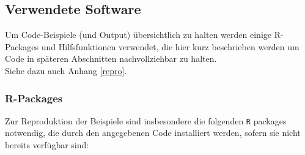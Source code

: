 \documentclass[ngerman,a4paper,]{scrartcl}
\theoremstyle{definition}
\theoremstyle{definition}
\theoremstyle{definition}
\theoremstyle{remark}
\begin{document}
\hypertarget{software-funs}{%
\subsection{Verwendete Software}\label{software-funs}}

Um Code-Beispiele (und Output) übersichtlich zu halten werden einige R-Packages und Hilfsfunktionen verwendet, die hier kurz beschrieben werden um Code in späteren Abschnitten nachvollziehbar zu halten.\\
Siehe dazu auch Anhang \ref{repro}.

\hypertarget{r-packages}{%
\subsubsection{R-Packages}\label{r-packages}}

Zur Reproduktion der Beispiele sind insbesondere die folgenden \texttt{R} packages notwendig, die durch den angegebenen Code installiert werden, sofern sie nicht bereits verfügbar sind:
\end{document}
